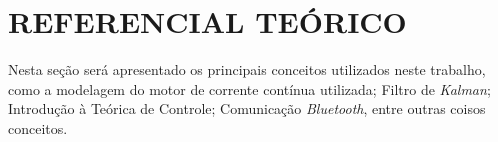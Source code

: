 \section{REFERENCIAL TEÓRICO}
Nesta seção será apresentado os principais conceitos utilizados neste trabalho, como a modelagem do motor de corrente contínua utilizada; Filtro de \emph{Kalman}; Introdução à Teórica de Controle; Comunicação \emph{Bluetooth}, entre outras coisos conceitos.







